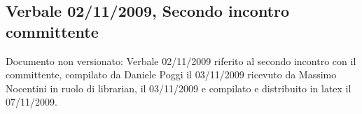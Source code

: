 \subsection{Verbale 02/11/2009, Secondo incontro committente}
Documento non versionato: Verbale 02/11/2009 riferito al secondo incontro con il 
committente, compilato da Daniele Poggi il 03/11/2009 ricevuto da Massimo Nocentini 
in ruolo di librarian, il 03/11/2009 e compilato e distribuito in latex il
07/11/2009.
